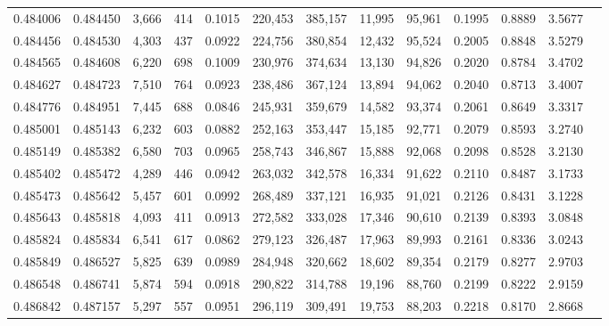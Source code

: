 \begin{tabular}{rrrrrrrrrrrrr}
0.484006 & 0.484450 &  3,666 &   414 &                                     0.1015 & 220,453 & 385,157 &  11,995 &  95,961 & 0.1995 & 0.8889 & 3.5677 \\
0.484456 & 0.484530 &  4,303 &   437 &                                     0.0922 & 224,756 & 380,854 &  12,432 &  95,524 & 0.2005 & 0.8848 & 3.5279 \\
0.484565 & 0.484608 &  6,220 &   698 &                                     0.1009 & 230,976 & 374,634 &  13,130 &  94,826 & 0.2020 & 0.8784 & 3.4702 \\
0.484627 & 0.484723 &  7,510 &   764 &                                     0.0923 & 238,486 & 367,124 &  13,894 &  94,062 & 0.2040 & 0.8713 & 3.4007 \\
0.484776 & 0.484951 &  7,445 &   688 &                                     0.0846 & 245,931 & 359,679 &  14,582 &  93,374 & 0.2061 & 0.8649 & 3.3317 \\
0.485001 & 0.485143 &  6,232 &   603 &                                     0.0882 & 252,163 & 353,447 &  15,185 &  92,771 & 0.2079 & 0.8593 & 3.2740 \\
0.485149 & 0.485382 &  6,580 &   703 &                                     0.0965 & 258,743 & 346,867 &  15,888 &  92,068 & 0.2098 & 0.8528 & 3.2130 \\
0.485402 & 0.485472 &  4,289 &   446 &                                     0.0942 & 263,032 & 342,578 &  16,334 &  91,622 & 0.2110 & 0.8487 & 3.1733 \\
0.485473 & 0.485642 &  5,457 &   601 &                                     0.0992 & 268,489 & 337,121 &  16,935 &  91,021 & 0.2126 & 0.8431 & 3.1228 \\
0.485643 & 0.485818 &  4,093 &   411 &                                     0.0913 & 272,582 & 333,028 &  17,346 &  90,610 & 0.2139 & 0.8393 & 3.0848 \\
0.485824 & 0.485834 &  6,541 &   617 &                                     0.0862 & 279,123 & 326,487 &  17,963 &  89,993 & 0.2161 & 0.8336 & 3.0243 \\
0.485849 & 0.486527 &  5,825 &   639 &                                     0.0989 & 284,948 & 320,662 &  18,602 &  89,354 & 0.2179 & 0.8277 & 2.9703 \\
0.486548 & 0.486741 &  5,874 &   594 &                                     0.0918 & 290,822 & 314,788 &  19,196 &  88,760 & 0.2199 & 0.8222 & 2.9159 \\
0.486842 & 0.487157 &  5,297 &   557 &                                     0.0951 & 296,119 & 309,491 &  19,753 &  88,203 & 0.2218 & 0.8170 & 2.8668 \\

\end{tabular}
